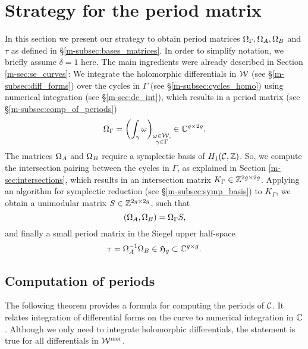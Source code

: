 \documentclass[main.tex]{subfiles}
\begin{document}
  \section{Strategy for the period matrix}\label{sec:strat_pm}

  In this section we present our strategy to obtain period matrices $\Omega_{\Gamma}, \Omega_A, \Omega_B$ and $\tau$ as defined in \S \ref{m-subsec:bases_matrices}. In order to simplify notation,
  we briefly assume $\delta = 1$ here. The main ingredients were already described in
  Section \ref{m-sec:se_curves}: \abstand We integrate the holomorphic differentials in $\mathcal{W}$ (see \S \ref{m-subsec:diff_forms})
  over the cycles in $\Gamma$ (see  \S \ref{m-subsec:cycles_homo}) using numerical integration (see \S \ref{m-sec:de_int}), which results in a period matrix (see \S \ref{m-subsec:comp_of_periods})
  \begin{equation}
      \label{eq:OC}
    \Omega_{\Gamma} = \left( \int_{\gamma} \omega \right)_{\substack{\omega \in \mathcal{W}, \\ \gamma \in \Gamma}} \in \mathbb{C}^{g \times 2g}.
  \end{equation}
  The matrices $\Omega_A$ and $\Omega_B$ require a symplectic basis of $H_1(\mathcal{C},\mathbb{Z})$.
  So, we compute the intersection pairing between the cycles in $\Gamma$, as explained in Section \ref{m-sec:intersections}, which results in an
  intersection matrix $K_{\Gamma} \in \mathbb{Z}^{2g \times 2g}$. \abstand
  Applying an algorithm for symplectic reduction (see \S \ref{m-subsec:symp_basis}) to $K_{\Gamma}$, we obtain a unimodular matrix $S \in \mathbb{Z}^{2g \times 2g}$, such that
  \begin{equation}
      \label{eq:OAOB}
      (\Omega_A,\Omega_B) = \Omega_{\Gamma} S,
  \end{equation}
   and finally a small period matrix in the Siegel upper half-space
  \begin{equation}
      \label{eq:tau}
   \tau = \Omega_A^{-1} \Omega_B \in \mathfrak{H}_g \subset \mathbb{C}^{g \times g}.
  \end{equation}

  \bigskip

  \subsection{Computation of periods}\label{subsec:comp_of_periods}

  The following theorem provides a formula for computing the periods of $\mathcal{C}$. It relates integration of differential forms on the curve to numerical integration in $\mathbb{C}$.
  Although we only need to integrate holomorphic
  differentials, the statement is true for all differentials in $\mathcal{W}^{\text{mer}}$.
\end{document}
